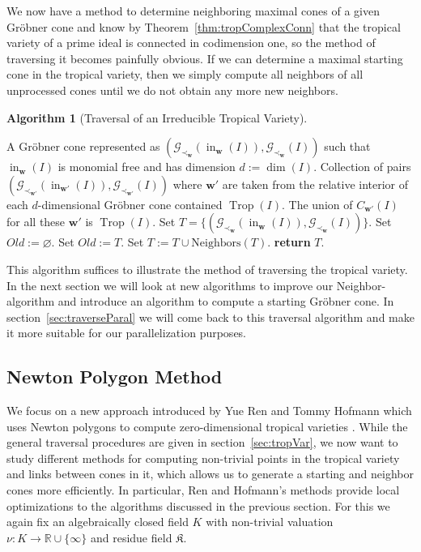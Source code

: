\documentclass[
  paper=a4,
  titlepage,
  bibliography=totoc,
  pagesize=pdftex
]{scrartcl}
\numberwithin{figure}{section}
\numberwithin{equation}{section}
\numberwithin{table}{section}
\newcommand*\setR{\mathds{R}}
\let\vec\mathbf
\DeclareMathOperator{\Trop}{Trop}
\DeclareMathOperator{\initial}{in}
\theoremstyle{definition}
\newtheorem{algo}[definition]{Algorithm}
\numberwithin{definition}{section}
\begin{document}
We now have a method to determine neighboring maximal cones of a given Gröbner cone and
know by Theorem~\ref{thm:tropComplexConn} that the tropical variety of a prime ideal is
connected in codimension one, so the method of traversing it becomes painfully obvious. If
we can determine a maximal starting cone in the tropical variety, then we simply compute
all neighbors of all unprocessed cones until we do not obtain any more new neighbors.

\begin{algo}[Traversal of an Irreducible Tropical Variety]\
  \label{alg:traversal}
  \begin{algorithmic}[1]
    \Require A Gröbner cone represented as $(\mathcal G_{\prec_{\vec w}}(\initial_{\vec
      w}(I)), \mathcal G_{\prec_{\vec w}}(I))$ such that $\initial_{\vec w}(I)$ is
      monomial free and has dimension $d:=\dim(I)$.
    \Ensure Collection of pairs $(\mathcal G_{\prec_{\vec w'}}(\initial_{\vec
      w'}(I)), \mathcal G_{\prec_{\vec w'}}(I))$ where $\vec w'$ are taken from the
      relative interior of each $d$-dimensional Gröbner cone contained $\Trop(I)$. The
      union of $C_{\vec w'}(I)$ for all these $\vec w'$ is $\Trop(I)$.
    \State Set $T = \{ (\mathcal G_{\prec_{\vec w}}(\initial_{\vec
      w}(I)), \mathcal G_{\prec_{\vec w}}(I)) \}$.
    \State Set $Old := \varnothing$.
      \State Set $Old := T$.
      \State Set $T := T \cup \mathrm{Neighbors}(T)$.
    \EndWhile
    \State\textbf{return} $T$.
  \end{algorithmic}
\end{algo}

This algorithm suffices to illustrate the method of traversing the tropical variety. In
the next section we will look at new algorithms to improve our Neighbor-algorithm and
introduce an algorithm to compute a starting Gröbner cone. In
section~\ref{sec:traverseParal} we will come back to this traversal algorithm and make it
more suitable for our parallelization purposes.

\subsection{Newton Polygon Method}
\label{sec:newtonMethod}

We focus on a new approach introduced by Yue Ren and Tommy Hofmann which uses Newton
polygons to compute zero-dimensional tropical varieties \cite{tropPointsLinks}. While the
general traversal procedures are given in section~\ref{sec:tropVar}, we now want to study
different methods for computing non-trivial points in the tropical variety and links
between cones in it, which allows us to generate a starting and neighbor cones more
efficiently. In particular, Ren and Hofmann's methods provide local optimizations to the
algorithms discussed in the previous section. For this we again fix an algebraically
closed field $K$ with non-trivial valuation $\nu:K\to\setR \cup \{\infty\}$ and
residue field $\mathfrak K$.
\end{document}
